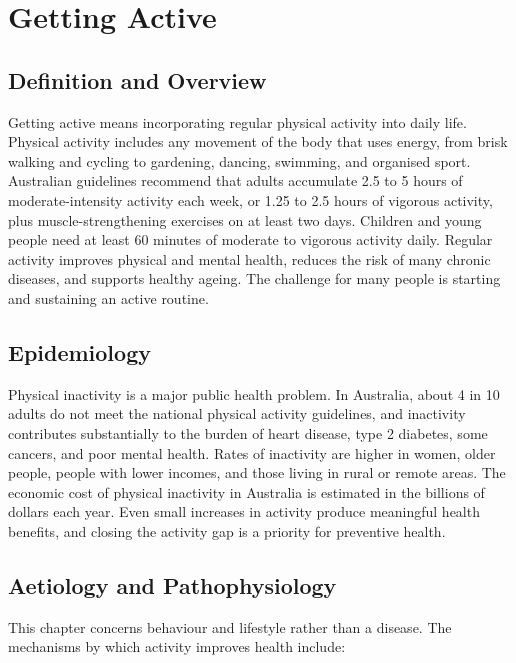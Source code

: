 \chapter{Getting Active}

\section*{Definition and Overview}
Getting active means incorporating regular physical activity into daily life. Physical activity includes any movement of the body that uses energy, from brisk walking and cycling to gardening, dancing, swimming, and organised sport. Australian guidelines recommend that adults accumulate 2.5 to 5 hours of moderate-intensity activity each week, or 1.25 to 2.5 hours of vigorous activity, plus muscle-strengthening exercises on at least two days. Children and young people need at least 60 minutes of moderate to vigorous activity daily. Regular activity improves physical and mental health, reduces the risk of many chronic diseases, and supports healthy ageing. The challenge for many people is starting and sustaining an active routine.

\section*{Epidemiology}
Physical inactivity is a major public health problem. In Australia, about 4 in 10 adults do not meet the national physical activity guidelines, and inactivity contributes substantially to the burden of heart disease, type 2 diabetes, some cancers, and poor mental health. Rates of inactivity are higher in women, older people, people with lower incomes, and those living in rural or remote areas. The economic cost of physical inactivity in Australia is estimated in the billions of dollars each year. Even small increases in activity produce meaningful health benefits, and closing the activity gap is a priority for preventive health.

\section*{Aetiology and Pathophysiology}
This chapter concerns behaviour and lifestyle rather than a disease. The mechanisms by which activity improves health include:

